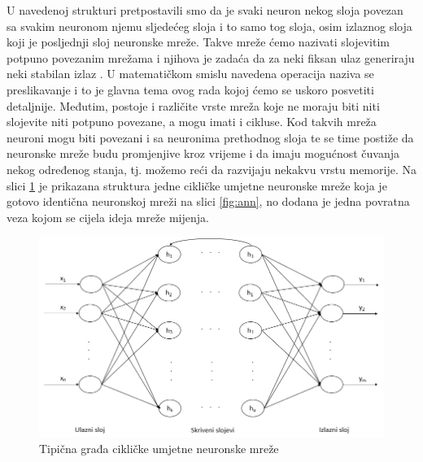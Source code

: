 \documentclass[times, utf8, zavrsni]{fer}
\begin{document}
U navedenoj strukturi pretpostavili smo da je svaki neuron nekog sloja povezan sa svakim neuronom njemu sljedećeg sloja i to samo tog sloja, osim izlaznog sloja koji je posljednji sloj neuronske mreže. Takve mreže ćemo nazivati slojevitim potpuno povezanim mrežama i njihova je zadaća da za neki fiksan ulaz generiraju neki stabilan izlaz \citep{cupicNENR}. U matematičkom smislu navedena operacija naziva se preslikavanje i to je glavna tema ovog rada kojoj ćemo se uskoro posvetiti detaljnije. Međutim, postoje i različite vrste mreža koje ne moraju biti niti slojevite niti potpuno povezane, a mogu imati i cikluse. Kod takvih mreža neuroni mogu biti povezani i sa neuronima prethodnog sloja te se time postiže da neuronske mreže budu promjenjive kroz vrijeme i da imaju mogućnost čuvanja nekog određenog stanja, tj. možemo reći da razvijaju nekakvu vrstu memorije. Na slici \ref{fig:cyclic-ann} je prikazana struktura jedne cikličke umjetne neuronske mreže koja je gotovo identična neuronskoj mreži na slici \ref{fig:ann}, no dodana je jedna povratna veza kojom se cijela ideja mreže mijenja.

\begin{figure}[H]
    \centering
    \includegraphics[scale=0.6]{img/cycle-ann.png}
    \caption[Caption for LOF]{Tipična građa cikličke umjetne neuronske mreže\footnotemark}
    \label{fig:cyclic-ann}
\end{figure}
\end{document}

